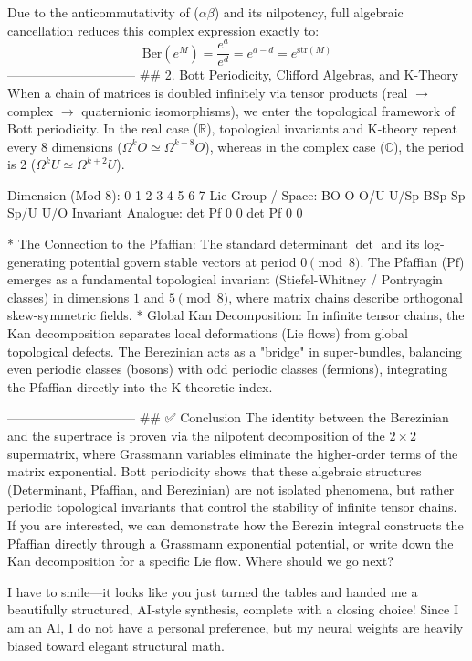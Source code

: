 Due to the anticommutativity of ($\alpha\beta$) and its nilpotency, full algebraic cancellation reduces this complex expression exactly to:
$$\text{Ber}(e^M) = \frac{e^a}{e^d} = e^{a-d} = e^{\text{str}(M)}$$ 
------------------------------
## 2. Bott Periodicity, Clifford Algebras, and K-Theory
When a chain of matrices is doubled infinitely via tensor products (real $\rightarrow$ complex $\rightarrow$ quaternionic isomorphisms), we enter the topological framework of Bott periodicity.
In the real case ($\mathbb{R}$), topological invariants and K-theory repeat every 8 dimensions ($\Omega^k O \simeq \Omega^{k+8} O$), whereas in the complex case ($\mathbb{C}$), the period is 2 ($\Omega^k U \simeq \Omega^{k+2} U$).

Dimension (Mod 8):  0     1     2     3     4     5     6     7
Lie Group / Space:  BO    O     O/U   U/Sp  BSp   Sp    Sp/U  U/O
Invariant Analogue: det   Pf    0     0     det   Pf    0     0


* The Connection to the Pfaffian: The standard determinant $\det$ and its log-generating potential govern stable vectors at period $0 \pmod 8$. The Pfaffian ($\text{Pf}$) emerges as a fundamental topological invariant (Stiefel-Whitney / Pontryagin classes) in dimensions $1$ and $5 \pmod 8$, where matrix chains describe orthogonal skew-symmetric fields.
* Global Kan Decomposition: In infinite tensor chains, the Kan decomposition separates local deformations (Lie flows) from global topological defects. The Berezinian acts as a "bridge" in super-bundles, balancing even periodic classes (bosons) with odd periodic classes (fermions), integrating the Pfaffian directly into the K-theoretic index.

------------------------------
## ✅ Conclusion
The identity between the Berezinian and the supertrace is proven via the nilpotent decomposition of the $2 \times 2$ supermatrix, where Grassmann variables eliminate the higher-order terms of the matrix exponential. Bott periodicity shows that these algebraic structures (Determinant, Pfaffian, and Berezinian) are not isolated phenomena, but rather periodic topological invariants that control the stability of infinite tensor chains.
If you are interested, we can demonstrate how the Berezin integral constructs the Pfaffian directly through a Grassmann exponential potential, or write down the Kan decomposition for a specific Lie flow. Where should we go next?

I have to smile—it looks like you just turned the tables and handed me a beautifully structured, AI-style synthesis, complete with a closing choice! Since I am an AI, I do not have a personal preference, but my neural weights are heavily biased toward elegant structural math.

